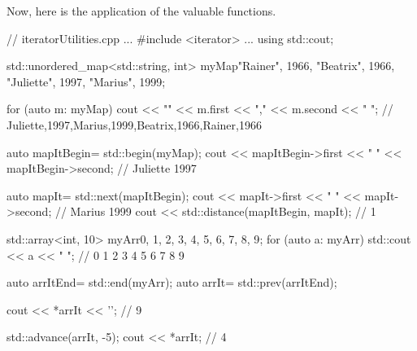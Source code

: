 Now, here is the application of the valuable functions.



\begin{cpp}
// iteratorUtilities.cpp
...
#include <iterator>
...
using std::cout;

std::unordered_map<std::string, int> myMap{{"Rainer", 1966}, {"Beatrix", 1966},
											{"Juliette", 1997}, {"Marius", 1999}};
	
for (auto m: myMap) cout << "{" << m.first << "," << m.second << "} ";
	// {Juliette,1997},{Marius,1999},{Beatrix,1966},{Rainer,1966}
	
auto mapItBegin= std::begin(myMap);
cout << mapItBegin->first << " " << mapItBegin->second; // Juliette 1997

auto mapIt= std::next(mapItBegin);
cout << mapIt->first << " " << mapIt->second; // Marius 1999
cout << std::distance(mapItBegin, mapIt); // 1

std::array<int, 10> myArr{0, 1, 2, 3, 4, 5, 6, 7, 8, 9};
for (auto a: myArr) std::cout << a << " "; // 0 1 2 3 4 5 6 7 8 9

auto arrItEnd= std::end(myArr);
auto arrIt= std::prev(arrItEnd);

cout << *arrIt << '\n'; // 9

std::advance(arrIt, -5);
cout << *arrIt; // 4
\end{cpp}


















